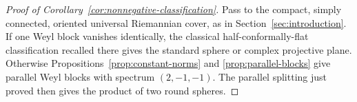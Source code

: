 \begin{proof}[Proof of Corollary~\ref{cor:nonnegative-classification}]
Pass to the compact, simply connected, oriented universal Riemannian
cover, as in Section~\ref{sec:introduction}. If one Weyl block vanishes
identically, the classical half-conformally-flat classification recalled
there gives the standard sphere or complex projective plane. Otherwise
Propositions~\ref{prop:constant-norms} and \ref{prop:parallel-blocks}
give parallel Weyl blocks with spectrum $(2,-1,-1)$. The parallel
splitting just proved then gives the product of two round spheres.
\end{proof}
